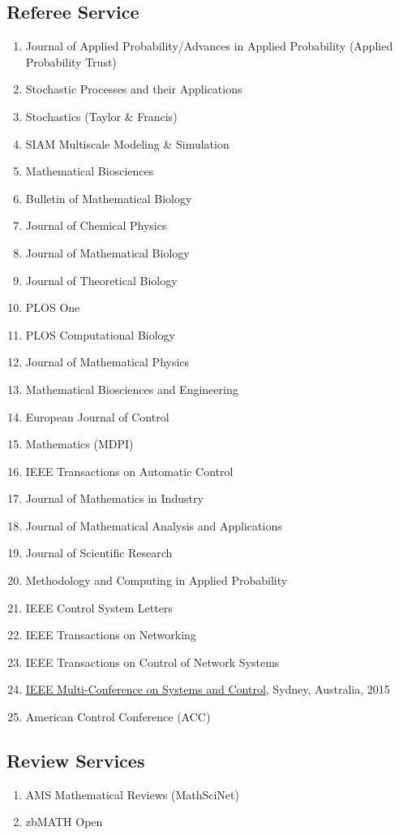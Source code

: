 \documentclass[11pt,a4paper,sans]{moderncv}        %
\begin{document}
\subsection{Referee Service}
\begin{enumerate}
	\item {Journal of Applied Probability/Advances in Applied Probability (Applied Probability Trust)}
	\item {Stochastic Processes and their Applications}
	\item Stochastics (Taylor \& Francis)
	\item SIAM Multiscale Modeling \& Simulation
	\item Mathematical Biosciences
	\item {Bulletin of Mathematical Biology}
	\item {Journal of Chemical Physics}
    \item {Journal of Mathematical Biology}
    \item Journal of Theoretical Biology
    \item {PLOS One}
    \item PLOS Computational Biology
    \item Journal of Mathematical Physics
    \item Mathematical Biosciences and Engineering
    \item European Journal of Control 
    \item {Mathematics (MDPI)}
	\item {IEEE Transactions on Automatic Control}
	\item Journal of Mathematics in Industry 
	\item Journal of Mathematical Analysis and Applications
	\item Journal of Scientific Research  
	\item Methodology and Computing in Applied Probability
	\item IEEE Control System Letters
	\item {IEEE Transactions on Networking}
    \item {IEEE Transactions on Control of Network Systems}
	\item {\href{http://msc2015.ieeecss.org/}{IEEE Multi-Conference on Systems and Control}, Sydney, Australia, 2015}
	\item American Control Conference (ACC)
\end{enumerate}

\subsection{Review Services}
\begin{enumerate}
	\item AMS Mathematical Reviews (MathSciNet)
	\item zbMATH Open
\end{enumerate}
\end{document}
